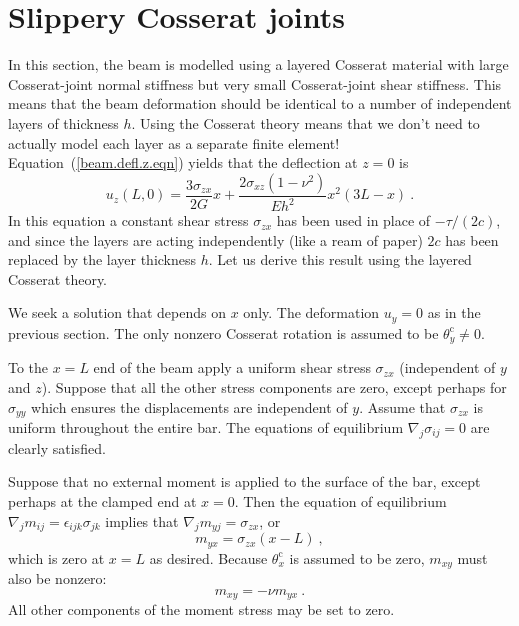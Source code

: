 \documentclass[]{scrreprt}
\newcommand{\thetac}{\theta^{\mathrm{c}}}
\begin{document}
\section{Slippery Cosserat joints}

In this section, the beam is modelled using a layered Cosserat
material with large Cosserat-joint normal stiffness but very small
Cosserat-joint shear stiffness.  This means that the beam deformation
should be identical to a number of independent layers of thickness
$h$.  Using the Cosserat theory means that we don't need to actually
model each layer as a separate finite element!
Equation~(\ref{beam.defl.z.eqn}) yields that the
deflection at $z=0$ is
\begin{equation}
u_{z}(L,0) = \frac{3\sigma_{zx}}{2 G}x + \frac{2\sigma_{xz} (1 -
  \nu^{2})}{Eh^{2}}x^{2}(3L - x) \ .
\label{expected.slippery.eqn}
\end{equation}
In this equation a constant shear stress $\sigma_{zx}$ has been used in
place of $-\tau/(2c)$, and since the layers are acting independently (like a
ream of paper) $2c$ has been replaced by the layer thickness $h$.
Let us derive this result using the layered Cosserat theory.

We seek a solution that depends on $x$ only.  The deformation
$u_{y}=0$ as in the previous section.  The only nonzero Cosserat
rotation is assumed to be $\thetac_{y}\neq 0$.

To the $x=L$ end of the beam apply a uniform shear stress
$\sigma_{zx}$ (independent of $y$ and $z$).  Suppose
that all the other stress components are zero, except perhaps for
$\sigma_{yy}$ which ensures the displacements are independent of
$y$.  Assume that $\sigma_{zx}$ is uniform throughout the entire
bar.  The equations of equilibrium $\nabla_{j}\sigma_{ij}=0$ are
clearly satisfied.

Suppose that no external moment is applied to the surface of the
bar, except perhaps at the clamped end at $x=0$.  Then the equation of
equilibrium $\nabla_{j}m_{ij} = \epsilon_{ijk}\sigma_{jk}$ implies
that $\nabla_{j}m_{yj} = \sigma_{zx}$, or
\begin{equation}
m_{yx} = \sigma_{zx}(x - L) \ ,
\end{equation}
which is zero at $x=L$ as desired.  Because $\thetac_{x}$ is assumed
to be zero, $m_{xy}$ must also be nonzero:
\begin{equation}
m_{xy} = -\nu m_{yx} \ .
\end{equation}
All other components of the moment stress may be set to zero.
\end{document}
